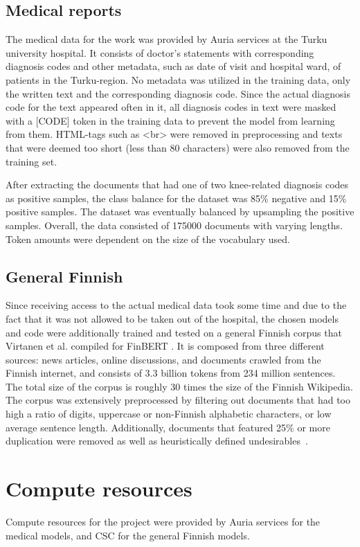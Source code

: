 \subsection{Medical reports}\label{Medical reports}
The medical data for the work was provided by Auria services at the Turku university hospital.
It consists of doctor's statements with corresponding diagnosis codes and other metadata, such as date of visit and hospital ward, of patients in the Turku-region.
No metadata was utilized in the training data, only the written text and the corresponding diagnosis code.
Since the actual diagnosis code for the text appeared often in it, all diagnosis codes in text were masked with a [CODE] token in the training data to prevent the model from learning from them.
HTML-tags such as <br> were removed in preprocessing and texts that were deemed too short (less than 80 characters) were also removed from the training set.

After extracting the documents that had one of two knee-related diagnosis codes as positive samples, the class balance for the dataset was 85\% negative and 15\% positive samples.
The dataset was eventually balanced by upsampling the positive samples.
Overall, the data consisted of 175000 documents with varying lengths.
Token amounts were dependent on the size of the vocabulary used.

\subsection{General Finnish}\label{General Finnish}
Since receiving access to the actual medical data took some time and due to the fact that it was not allowed to be taken out of the hospital, the chosen models and code were additionally trained and tested on a general Finnish corpus that Virtanen et al. compiled for FinBERT \cite{virtanen2019}.
It is composed from three different sources: news articles, online discussions, and documents crawled from the Finnish internet, and consists of 3.3 billion tokens from 234 million sentences.
The total size of the corpus is roughly 30 times the size of the Finnish Wikipedia.
The corpus was extensively preprocessed by filtering out documents that had too high a ratio of digits, uppercase or non-Finnish alphabetic characters, or low average sentence length.
Additionally, documents that featured 25\% or more duplication were removed as well as heuristically defined undesirables~\cite{virtanen2019}.


\section{Compute resources} \label{Compute resources}
Compute resources for the project were provided by Auria services for the medical models, and CSC for the general Finnish models.

